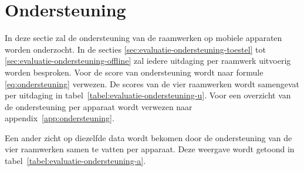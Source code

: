 \section{Ondersteuning}
\label{sec:evaluatie-ondersteuning}

In deze sectie zal de ondersteuning van de raamwerken op mobiele apparaten worden onderzocht.
In de secties \ref{sec:evaluatie-ondersteuning-toestel} tot \ref{sec:evaluatie-ondersteuning-offline} zal iedere uitdaging per raamwerk uitvoerig worden besproken.
Voor de score van ondersteuning wordt naar formule \ref{eq:ondersteuning} verwezen.
De scores van de vier raamwerken wordt samengevat per uitdaging in tabel~\ref{tabel:evaluatie-ondersteuning-u}.
Voor een overzicht van de ondersteuning per apparaat wordt verwezen naar appendix~\ref{app:ondersteuning}.

\begin{table}[H]
\centering
\resizebox{14cm}{!} {
}
\caption{Overzicht van ondersteuning per uitdaging.}
\label{tabel:evaluatie-ondersteuning-u}
\end{table}

Een ander zicht op diezelfde data wordt bekomen door de ondersteuning van de vier raamwerken samen te vatten per apparaat.
Deze weergave wordt getoond in tabel~\ref{tabel:evaluatie-ondersteuning-a}.

